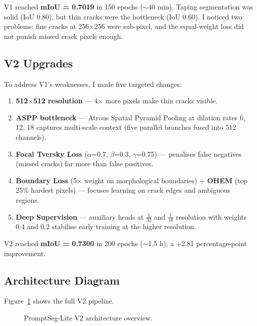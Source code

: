 \documentclass[12pt,a4paper]{article}
\begin{document}
V1 reached \textbf{mIoU = 0.7019} in 150 epochs ($\sim$40 min).  Taping segmentation was solid (IoU 0.80), but thin cracks were the bottleneck (IoU 0.60).  I noticed two problems: fine cracks at 256$\times$256 were sub-pixel, and the equal-weight loss did not punish missed crack pixels enough.

\subsection{V2 Upgrades}

To address V1's weaknesses, I made five targeted changes:

\begin{enumerate}[nosep]
  \item \textbf{512$\times$512 resolution} --- 4$\times$ more pixels make thin cracks visible.
  \item \textbf{ASPP bottleneck} --- Atrous Spatial Pyramid Pooling at dilation rates 6, 12, 18 captures multi-scale context (five parallel branches fused into 512 channels).
  \item \textbf{Focal Tversky Loss} ($\alpha$=0.7, $\beta$=0.3, $\gamma$=0.75) --- penalises false negatives (missed cracks) far more than false positives.
  \item \textbf{Boundary Loss} (5$\times$ weight on morphological boundaries) + \textbf{OHEM} (top 25\% hardest pixels) --- focuses learning on crack edges and ambiguous regions.
  \item \textbf{Deep Supervision} --- auxiliary heads at $\frac{1}{32}$ and $\frac{1}{16}$ resolution with weights 0.4 and 0.2 stabilise early training at the higher resolution.
\end{enumerate}

V2 reached \textbf{mIoU = 0.7300} in 200 epochs ($\sim$1.5 h), a +2.81 percentage-point improvement.

\subsection{Architecture Diagram}

Figure~\ref{fig:arch} shows the full V2 pipeline.

\begin{figure}[H]
\centering
{}
\caption{PromptSeg-Lite V2 architecture overview.}
\label{fig:arch}
\end{figure}
\end{document}
